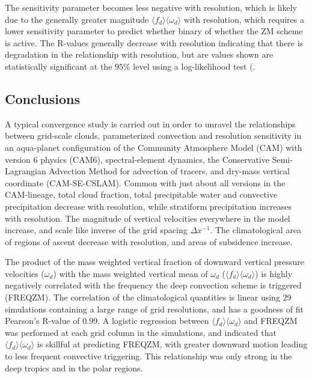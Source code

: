 The sensitivity parameter becomes less negative with resolution, which is likely due to the generally greater magnitude $\langle f_{d} \rangle \langle \omega_{d} \rangle$ with resolution, which requires a lower sensitivity parameter to predict whether binary of whether the ZM scheme is active. The R-values generally decrease with resolution indicating that there is degradation in the relationship with resolution, but are values shown are statistically significant at the $95\%$ level using a log-likelihood test (\citep{WILKSBOOK}.
 
\subsection{Conclusions}

A typical convergence study is carried out in order to unravel the relationships between grid-scale clouds, parameterized convection and resolution sensitivity in an aqua-planet configuration of the Community Atmosphere Model (CAM) with version 6 physics (CAM6), spectral-element dynamics, the Conservative Semi-Lagrangian Advection Method for advection of tracers, and dry-mass vertical coordinate (CAM-SE-CSLAM). Common with just about all versions in the CAM-lineage, total cloud fraction, total precipitable water and convective precipitation decrease with resolution, while stratiform precipitation increases with resolution. The magnitude of vertical velocities everywhere in the model increase, and scale like inverse of the grid spacing $\Delta x^{-1}$. The climatological area of regions of ascent decrease with resolution, and areas of subsidence increase.

 The product of the mass weighted vertical fraction of downward vertical pressure velocities ($\omega_d$) with the mass weighted vertical mean of $\omega_d$ ($\langle f_{d} \rangle \langle \omega_{d} \rangle$) is highly negatively correlated with the frequency the \cite{ZM1995AO} deep convection scheme is triggered (FREQZM). The correlation of the climatological quantities is linear using 29 simulations containing a large range of grid resolutions, and has a goodness of fit Pearson's R-value of 0.99. A logistic regression between $\langle f_{d} \rangle \langle \omega_{d} \rangle$ and FREQZM was performed at each grid column in the simulations, and indicated that $\langle f_{d} \rangle \langle \omega_{d} \rangle$ is skillful at predicting FREQZM, with greater downward motion leading to less frequent convective triggering. This relationship was only strong in the deep tropics and in the polar regions.
 
